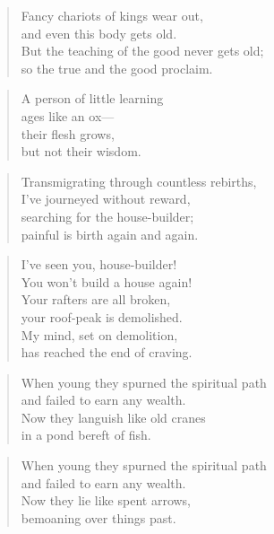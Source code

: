 \documentclass[12pt,openany]{book}%
\begin{document}
\begin{verse}%
Fancy chariots of kings wear out, \\
and even this body gets old. \\
But the teaching of the good never gets old; \\
so the true and the good proclaim. 

%
\end{verse}

\begin{verse}%
A person of little learning \\
ages like an ox—\\
their flesh grows, \\
but not their wisdom. 

%
\end{verse}

\begin{verse}%
Transmigrating through countless rebirths, \\
I’ve journeyed without reward, \\
searching for the house-builder; \\
painful is birth again and again. 

%
\end{verse}

\begin{verse}%
I’ve seen you, house-builder! \\
You won’t build a house again! \\
Your rafters are all broken, \\
your roof-peak is demolished. \\
My mind, set on demolition, \\
has reached the end of craving. 

%
\end{verse}

\begin{verse}%
When young they spurned the spiritual path \\
and failed to earn any wealth. \\
Now they languish like old cranes \\
in a pond bereft of fish. 

%
\end{verse}

\begin{verse}%
When young they spurned the spiritual path \\
and failed to earn any wealth. \\
Now they lie like spent arrows, \\
bemoaning over things past. 

%
\end{verse}
\end{document}
